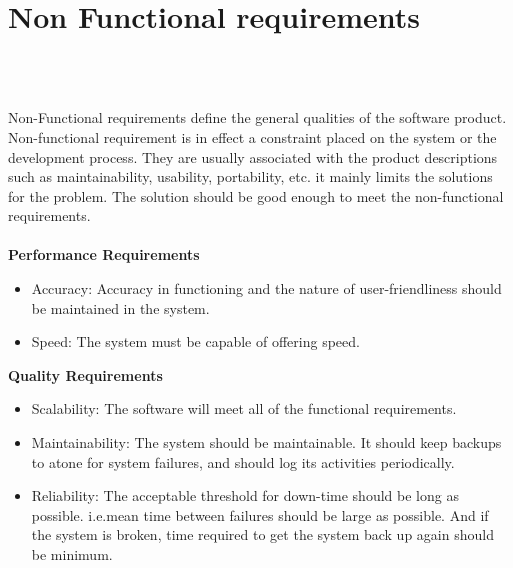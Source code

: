 \section{Non Functional requirements}
\\ \\
\par Non-Functional requirements define the general qualities of the software product. Non-functional requirement is in effect a constraint placed on the system or the development process. They are usually associated with the product descriptions such as maintainability, usability, portability, etc. it mainly limits the solutions for the problem. The solution should be good enough to meet the non-functional requirements.\\ 
\\
\textbf{Performance Requirements}\\
\begin{itemize}
\item Accuracy: Accuracy in functioning and the nature of user-friendliness should be
maintained in the system.\\
\item Speed: The system must be capable of offering speed.\\
\end{itemize}
\newpage
\textbf{Quality Requirements}
\begin{itemize}
\item Scalability: The software will meet all of the functional requirements. \\
\item Maintainability: The system should be maintainable. It should keep backups to atone for system failures, and should log its activities periodically. \\
\item Reliability: The acceptable threshold for down-time should be long as possible. i.e.mean time between failures should be large as possible. And if the system is broken,
time required to get the system back up again should be minimum. \\
\end{itemize}
